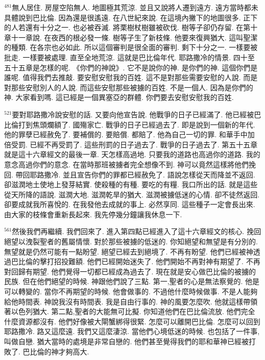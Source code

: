 \documentclass{book}
\begin{document}
$^{481}$無人居住.
房屋空陷無人.
地圖極其荒涼.
並且又說將人遷到遠方.
遠方當時都未具體說到巴比倫.
因為還是很遙遠.
在八世紀來說.
在這境內撇下的地圖很多.
正下的人若還有十分之一.
也必被吞滅.
將栗樹杖樹雖被砍伐.
樹等子卻仍存留.
在第十章十一章說.
在夜西的根必發一條.
樹等子生了新枝條.
他要來復興猶大.
這叫聖潔的種類.
在各宗也必如此.
所以這個審判是很全面的審判.
剩下十分之一.
一樣要被批走.
一樣要被處理.
直至全地荒涼.
這就是巴比倫年代.
耶路撒冷的情景.
四十至五十五章是怎樣的呢.
《你們的神說》.
它不是說你的神.
是你們的神.
這個你們是誰呢.
值得我們去推敲.
要安慰安慰我的百姓.
這不是對那些需要安慰的人說.
而是對那些安慰別人的人說.
而這些安慰那些被擄的百姓.
不是一個人.
因為是你們的神.
大家看到嗎.
這已經是一個異塞亞的群體.
你們要去安慰安慰我的百姓.

$^{521}$要對耶路撒冷說安慰的話.
又要向他宣告說.
他戰爭的日子已經滿了.
他已經被巴比倫打到焦頭爛額了.
國殤家亡.
戰爭的日子已經過去了.
即是說到一個新的年代.
他的罪孽已經赦免了.
要補償的.
要賠償.
都賠了.
他為自己一切的罪.
和華手中加倍受罰.
已經不再受罰了.
這些刑罰的日子過去了.
戰爭的日子過去了.
第五十五章就是這十六章經文的最後一章.
天怎樣高過地.
只要我的道路也高過你的道路.
我的意念高過你們的意念.
在當時那班被擄者完全想像不到.
神可以竟然這樣將他們挽回.
帶回耶路撒冷.
並且宣告你們的罪都已經赦免了.
語說怎樣從天而降並不返回.
卻滋潤地土使地上發芽結實.
使殺種的有種.
要吃的有糧.
我口所出的話.
就是這些從天所降的語說.
滋潤大地.
滋潤乾旱的猶大.
滋潤被擄低迷的心情.
卻不徒然返回.
卻要成就我所喜悅的.
在我發他去成就的事上.
必然享同.
這些種子一定會長出來.
由大家的枝條會重新長起來.
我先停幾分鐘讓我休息一下.

$^{561}$然後我們再繼續.
我們回來了.
進入第四點已經進入了這十六章經文的核心.
挽回絕望以洩裂聖者的舊屬情懷.
對於那些被擄的低迷的.
你知絕望和無望是有分別的.
無望就是仍然可能有一點盼望.
絕望已經去到絕境了.
不再有盼望.
他們已經被神透過巴比倫的擊打招投難額.
他們已經開始迷失了.
他們開始不再對神有期望了.
不再對回歸有期望.
他們覺得一切都已經成為過去了.
現在就是安心做巴比倫的被擄的民族.
但在他們絕望的時候.
神跟他們說了三點.
第一,聖者的心是無法察覺的.
他是可以轉變的.
當你不再期望的時候.
他會做事的.
不過他什麼時候做事.
不是人能夠給他時間表.
神說我沒有時間表.
我是自由行事的.
神的風要怎麼吹.
他就這樣帶領著以色列猶大.
第二點,聖者的大能無可比擬.
你知道他們在巴比倫流放.
他們完全什麼資源都沒有.
他們好像被大閘蟹綁得很緊.
怎麼可以離開巴比倫.
怎麼可以回到耶路撒冷.
路又這麼遠.
我們又這麼淒涼.
當他們心境低迷的時候.
也包括了一件事,叫做自戀.
猶大當時的處境是非常自戀的.
他們甚至覺得我們的耶和華神已經被打敗了.
巴比倫的神才夠高大.
\end{document}
